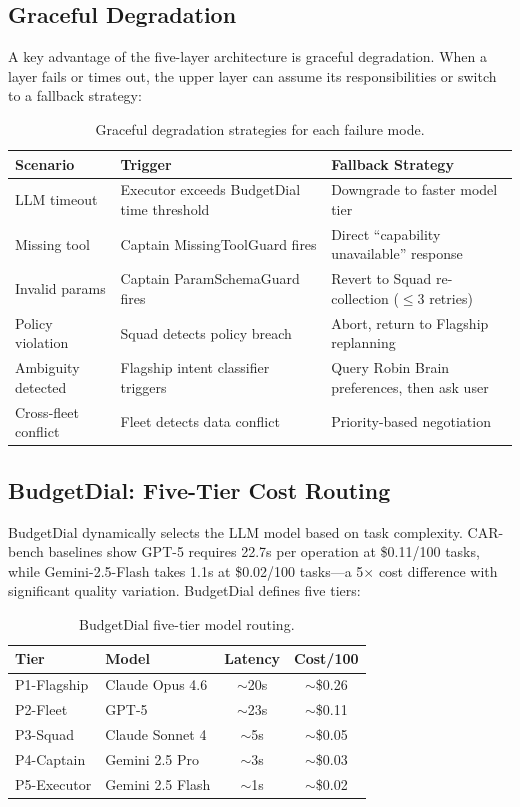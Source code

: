 \documentclass{article}
\begin{document}
\subsection{Graceful Degradation}

A key advantage of the five-layer architecture is graceful degradation. When a layer fails or times out, the upper layer can assume its responsibilities or switch to a fallback strategy:

\begin{table}[t]
\centering
\caption{Graceful degradation strategies for each failure mode.}
\label{tab:degradation}
\small
\begin{tabular}{lp{2.2in}p{1.8in}}
\toprule
\textbf{Scenario} & \textbf{Trigger} & \textbf{Fallback Strategy} \\
\midrule
LLM timeout & Executor exceeds BudgetDial time threshold & Downgrade to faster model tier \\
Missing tool & Captain MissingToolGuard fires & Direct ``capability unavailable'' response \\
Invalid params & Captain ParamSchemaGuard fires & Revert to Squad re-collection ($\le$3 retries) \\
Policy violation & Squad detects policy breach & Abort, return to Flagship replanning \\
Ambiguity detected & Flagship intent classifier triggers & Query Robin Brain preferences, then ask user \\
Cross-fleet conflict & Fleet detects data conflict & Priority-based negotiation \\
\bottomrule
\end{tabular}
\end{table}

\subsection{BudgetDial: Five-Tier Cost Routing}

BudgetDial dynamically selects the LLM model based on task complexity. CAR-bench baselines show GPT-5 requires 22.7s per operation at \$0.11/100 tasks, while Gemini-2.5-Flash takes 1.1s at \$0.02/100 tasks---a 5$\times$ cost difference with significant quality variation. BudgetDial defines five tiers:

\begin{table}[t]
\centering
\caption{BudgetDial five-tier model routing.}
\label{tab:budgetdial}
\small
\begin{tabular}{lp{1.6in}cc}
\toprule
\textbf{Tier} & \textbf{Model} & \textbf{Latency} & \textbf{Cost/100} \\
\midrule
P1-Flagship & Claude Opus 4.6 & $\sim$20s & $\sim$\$0.26 \\
P2-Fleet & GPT-5 & $\sim$23s & $\sim$\$0.11 \\
P3-Squad & Claude Sonnet 4 & $\sim$5s & $\sim$\$0.05 \\
P4-Captain & Gemini 2.5 Pro & $\sim$3s & $\sim$\$0.03 \\
P5-Executor & Gemini 2.5 Flash & $\sim$1s & $\sim$\$0.02 \\
\bottomrule
\end{tabular}
\end{table}
\end{document}
